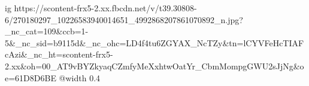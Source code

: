 
 
 
 
 

\ifcmt
  ig https://scontent-frx5-2.xx.fbcdn.net/v/t39.30808-6/270180297_10226583940014651_4992868207861070892_n.jpg?_nc_cat=109&ccb=1-5&_nc_sid=b9115d&_nc_ohc=LD4f4tu6ZGYAX_NcTZy&tn=lCYVFeHcTIAFcAzi&_nc_ht=scontent-frx5-2.xx&oh=00_AT9vBYZkyaqCZmfyMeXxhtwOatYr_CbmMompgGWU2sJjNg&oe=61D8D6BE
  @width 0.4
\fi
